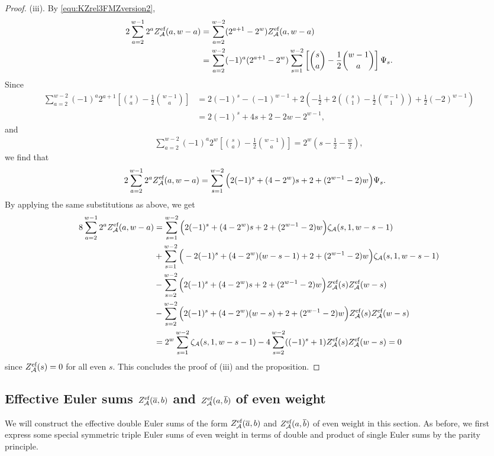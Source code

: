 \documentclass{article}
\newcommand{\calA}{\mathcal{A}}
\newcommand{\eff}{\text{\rm{ef}}}
\newcommand{\ol}{\overline}
\theoremstyle{plain}
\theoremstyle{definition}
\begin{document}
\begin{proof}
\bigskip
(iii). By \eqref{equ:KZrel3FMZversion2},
\begin{align*}
2\sum_{a=2}^{w-1} 2^a Z_\calA^\eff(a,w-a)& = \sum_{a=2}^{w-2} (2^{a+1} -2^w)Z_\calA^\eff(a,w-a)\\
& = \sum_{a=2}^{w-2} (-1)^a (2^{a+1} -2^w) \sum_{s=1}^{w-2} \left[ \binom{s}{a}-\frac12\binom{w-1}{a}\right] \Psi_s.
\end{align*}
Since
\begin{align*}
\sum_{a=2}^{w-2}(-1)^a  2^{a+1}
\left[\binom{s}{a}-\frac12\binom{w-1}{a}\right]
& =2(-1)^s-(-1)^{w-1}+2\left(-\frac 12+2\left(\binom{s}{1}-\frac12\binom{w-1}{1}\right)+\frac 12(-2)^{w-1}\right) \\
&=2(-1)^s+4s+2-2w-2^{w-1},
\end{align*}
and
\begin{align*}
 \sum_{a=2}^{w-2}(-1)^a  2^w
\left[\binom{s}{a}-\frac12\binom{w-1}{a}\right]
= 2^w \left(s-\frac 12-\frac w2\right),
\end{align*}
we find that
\begin{align*}
2\sum_{a=2}^{w-1} 2^a Z_\calA^\eff(a,w-a)
& = \sum_{s=1}^{w-2}\Big(2(-1)^s+(4-2^w)s+2+(2^{w-1}-2)w\Big) \Psi_s.
\end{align*}
By applying the same substitutions as above, we get
\begin{align*}
8\sum_{a=2}^{w-1} 2^a  Z_\calA^\eff(a,w-a)
& =  \sum_{s=1}^{w-2}\Big(2(-1)^s+(4-2^w)s+2+(2^{w-1}-2)w\Big) \zeta_\calA(s,1,w-s-1) \\
&+ \sum_{s=1}^{w-2}\Big(-2(-1)^s+(4-2^w)(w-s-1)+2+(2^{w-1}-2)w\Big) \zeta_\calA(s,1,w-s-1)\\
&- \sum_{s=2}^{w-2}\Big(2(-1)^s+(4-2^w)s+2+(2^{w-1}-2)w\Big)  Z_\calA^\eff(s)Z_\calA^\eff(w-s)\\
&-\sum_{s=2}^{w-2}\Big(2(-1)^s+(4-2^w)(w-s)+2+(2^{w-1}-2)w\Big) Z_\calA^\eff(s)Z_\calA^\eff(w-s)\\
&= 2^w\sum_{s=1}^{w-2}\zeta_\calA(s,1,w-s-1) -4\sum_{s=2}^{w-2} ((-1)^s+1) Z_\calA^\eff(s)Z_\calA^\eff(w-s)=0
\end{align*}
since $Z_\calA^\eff(s)=0$ for all even $s$. This concludes the proof of (iii) and the proposition.
\end{proof}


\subsection{Effective Euler sums $Z_\calA^\eff(\ol{a},b)$ and $Z_\calA^\eff(a,\ol{b})$ of even weight}
We will construct the effective double Euler sums of the form $Z_\calA^\eff(\ol{a},b)$ and $Z_\calA^\eff(a,\ol{b})$ of even weight in this section. As before, we first express some special symmetric triple Euler sums of even weight in terms of double and product of single Euler sums by the parity principle.
\end{document}
